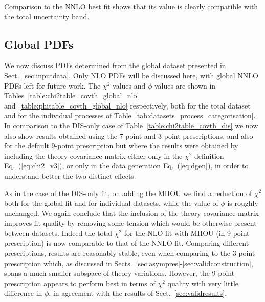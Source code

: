 Comparison to the NNLO best fit shows that its value is clearly
compatible with the total uncertainty band.


\subsection{Global PDFs}
\label{sec:globmhou}

We now discuss PDFs determined from the global dataset presented in
Sect.~\ref{sec:inputdata}. Only NLO PDFs will be discussed here, with 
global NNLO PDFs left for future work. %
The $\chi^2$ values and $\phi$ values are shown in
Tables~\ref{table:chi2table_covth_global_nlo}
and~\ref{table:phitable_covth_global_nlo} 
respectively, both for the total dataset and for the  individual
processes of Table~\ref{tab:datasets_process_categorisation}.
In comparison to the DIS-only case of
Table~\ref{table:chi2table_covth_dis} we now also show results
obtained using the 7-point and 3-point prescriptions, and also for the
default 9-point prescription but where the results were obtained by 
including the theory
covariance matrix either only in the $\chi^2$ definition Eq.~(\ref{eq:chi2_v3}), or only in the data generation Eq.~(\ref{eq:dgen}), in order to understand better the two distinct effects.

As in the case of the DIS-only fit, on adding the MHOU 
we find a reduction of $\chi^2$
both for the global fit and for individual datasets, while the value of
$\phi$ is roughly unchanged. We again conclude that the
inclusion of the theory covariance matrix improves fit quality by
removing some tension which would be otherwise present between
datasets. Indeed the total $\chi^2$ for the NLO fit with MHOU 
(in 9-point prescription) is now comparable to that of the NNLO fit.
Comparing different prescriptions, results are  reasonably
stable, even when comparing to the 3-point prescription which, as
discussed in Sects.~\ref{sec:asympres}-\ref{sec:validconstruction},
spans a much smaller subspace of theory variations. However, the
9-point prescription appears to perform best in terms of $\chi^2$
quality with very little difference in $\phi$, in agreement
with the results of Sect.~\ref{sec:validresults}.

